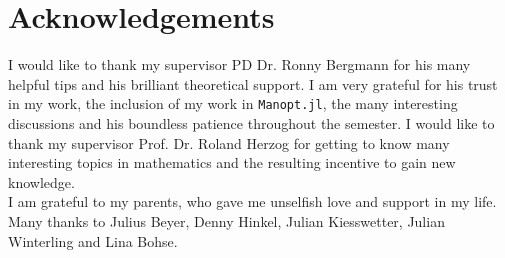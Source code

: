 \chapter*{Acknowledgements}

I would like to thank my supervisor PD Dr. Ronny Bergmann for his many helpful tips and his brilliant theoretical support. I am very grateful for his trust in my work, the inclusion of my work in \lstinline!Manopt.jl!, the many interesting discussions and his boundless patience throughout the semester. I would like to thank my supervisor Prof. Dr. Roland Herzog for getting to know many interesting topics in mathematics and the resulting incentive to gain new knowledge. \\
I am grateful to my parents, who gave me unselfish love and support in my life. Many thanks to Julius Beyer, Denny Hinkel, Julian Kiesswetter, Julian Winterling and Lina Bohse. 